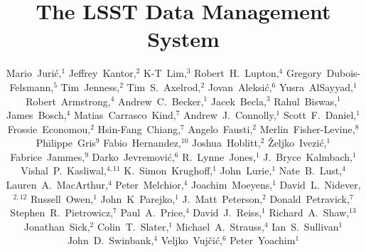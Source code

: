 \documentclass[11pt,twoside]{article}
\begin{document}
\title{The LSST Data Management System}
\author{
Mario~Juri\'c,$^1$
Jeffrey~Kantor,$^2$
K-T~Lim,$^3$
Robert~H.~Lupton,$^4$
Gregory~Dubois-Felsmann,$^5$
Tim~Jenness,$^2$
Tim~S.~Axelrod,$^2$
Jovan~Aleksi\'c,$^6$
Yusra~AlSayyad,$^1$
Robert~Armstrong,$^4$
Andrew~C.~Becker,$^1$
Jacek~Becla,$^3$
Rahul~Biswas,$^1$
James~Bosch,$^4$
Matias~Carrasco~Kind,$^7$
Andrew~J.~Connolly,$^1$
Scott~F.~Daniel,$^1$
Frossie~Economou,$^2$
Hsin-Fang~Chiang,$^7$
Angelo~Fausti,$^2$
Merlin~Fisher-Levine,$^8$
Philippe~Gris$^9$
Fabio~Hernandez,$^{10}$
Joshua~Hoblitt,$^2$
\v{Z}eljko~Ivezi\'{c},$^1$
Fabrice~Jammes,$^9$
Darko~Jevremovi\'c,$^6$
R.~Lynne~Jones,$^1$
J.~Bryce~Kalmbach,$^1$
Vishal~P.~Kasliwal,$^{4,11}$
K.~Simon~Krughoff,$^1$
John~Lurie,$^1$
Nate~B.~Lust,$^4$
Lauren~A.~MacArthur,$^4$
Peter~Melchior,$^4$
Joachim~Moeyens,$^1$
David~L.~Nidever,$^{2,12}$
Russell~Owen,$^1$
John~K~Parejko,$^1$
J.~Matt~Peterson,$^2$
Donald~Petravick,$^7$
Stephen~R.~Pietrowicz,$^7$
Paul~A.~Price,$^4$
David~J.~Reiss,$^1$
Richard~A.~Shaw,$^{13}$
Jonathan~Sick,$^2$
Colin~T.~Slater,$^1$
Michael~A.~Strauss,$^4$
Ian~S.~Sullivan$^1$
John~D.~Swinbank,$^4$
Veljko~Vuj\v ci\'c,$^6$
Peter~Yoachim$^1$
%
}
\end{document}
